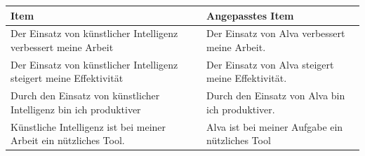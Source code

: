 \begin{center}
\begin{threeparttable}
\caption{Items für Konstrukt: PUF}
\label{tab:PUF}
\begin{tabularx}{\textwidth}{X X}
\toprule
\textbf{Item} & \textbf{Angepasstes Item} \\
\midrule
Der Einsatz von künstlicher Intelligenz verbessert meine Arbeit & Der Einsatz von Alva verbessert meine Arbeit. \\
Der Einsatz von künstlicher Intelligenz steigert meine Effektivität & Der Einsatz von Alva steigert meine Effektivität. \\
Durch den Einsatz von künstlicher Intelligenz bin ich produktiver & Durch den Einsatz von Alva bin ich produktiver. \\
Künstliche Intelligenz ist bei meiner Arbeit ein nützliches Tool. & Alva ist bei meiner Aufgabe ein nützliches Tool \\
\bottomrule
\end{tabularx}
\end{threeparttable}
\end{center}
\vspace{1em}